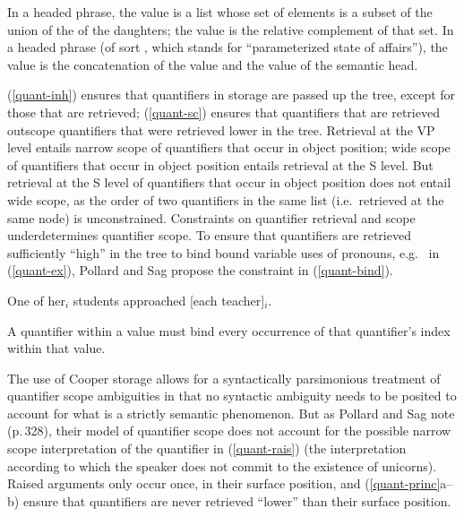 \documentclass[output=paper
	        ,collection
	        ,collectionchapter
 	        ,biblatex
                ,babelshorthands
                ,newtxmath
                ,draftmode
                ,colorlinks, citecolor=brown
]{langscibook}
\begin{document}
\eal \label{quant-princ}
\ex\label{quant-inh}
In a headed phrase, the  value is a list whose set of elements is a subset of the union of the  of the daughters; the  value is the relative complement of that set.
\ex\label{quant-sc}
In a headed phrase (of sort , which stands for ``parameterized state of affairs''), the  value is the concatenation of the  value and the  value of the semantic head.
\zl


(\ref{quant-inh}) ensures that quantifiers in storage are passed up the tree, except for those that are retrieved; (\ref{quant-sc}) ensures that quantifiers that are retrieved outscope quantifiers that were retrieved lower in the tree. Retrieval at the VP level entails narrow scope of quantifiers that occur in object position; wide scope of quantifiers that occur in object position entails retrieval at the S level. But retrieval at the S level of quantifiers that occur in object position does not entail wide scope, as the order of two quantifiers in the same  list (i.e.\ retrieved at the same node) is unconstrained. Constraints on quantifier retrieval and scope underdetermines quantifier scope. To ensure that quantifiers are retrieved sufficiently ``high'' in the tree to bind bound variable uses of pronouns, e.g.\  in (\ref{quant-ex}), Pollard and Sag propose the constraint in (\ref{quant-bind}).

\begin{exe}
\ex\label{quant-ex}
One of her$_{i}$ students approached [each teacher]$_{i}$. \citep[Example 27a]{PollardandSag1994}
\end{exe}

\begin{exe}
\ex\label{quant-bind}A quantifier within a  value must bind every occurrence of that quantifier's index within that  value.  
\end{exe}

The use of Cooper storage allows for a syntactically parsimonious treatment of quantifier scope ambiguities in that no syntactic ambiguity needs to be posited to account for what is a strictly semantic phenomenon. But as Pollard and Sag note (p.\,328), their model of quantifier scope does not account for the possible narrow scope interpretation of the quantifier  in (\ref{quant-rais}) (the interpretation according to which the speaker does not commit to the existence of unicorns). Raised arguments only occur once, in their surface position, and (\ref{quant-princ}a--b) ensure that quantifiers are never retrieved ``lower'' than their surface position.
\end{document}
